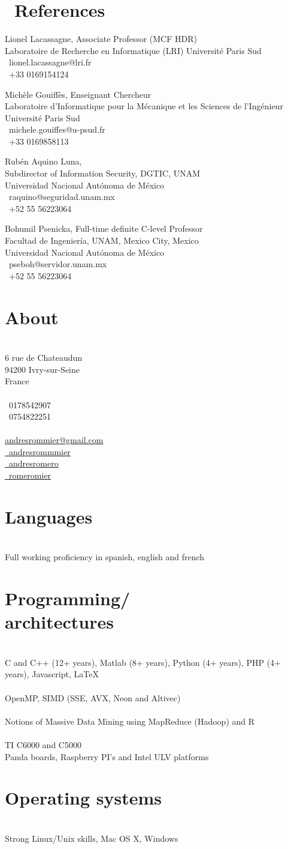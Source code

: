 \documentclass[]{friggeri-cv}
\makeatletter
\def\twitter{{\FA \faTwitter}}
\def\github{{\FA \faGithub}}
\def\linkedin{{\FA \faLinkedin}}
\def\envelope{{\FA \faEnvelopeAlt}}
\def\phone{{\FA \faPhone}}
\def\mobilePhone{{\FA \faMobilePhone}}
\def\quotesymbol{{\FA \faQuote}}
\newcommand{\printaside}{
  \begin{aside}
    \section{About}
      \\
      {6 rue de Chateaudun\\
        94200 Ivry-sur-Seine\\
        France\\
        ~\\
        \phone\ 0178542907\\
        \mobilePhone\ 0754822251\\
        ~\\
        \href{mailto:andresrommier@gmail.com}{\envelope andresrommier@gmail.com}\\
        \href{http://twitter.com/andresrommier}{\twitter\ andresrommmier}\\
        \href{http://andresromero.github.com}{\github\ andresromero}\\
        \href{https://www.linkedin.com/in/romeromier}{\linkedin\ romeromier}}\\
    \section{Languages}\\
      {Full working proficiency in spanish, english and french}\\
    \section{Programming/ \\ architectures}\\
      {C and C++ (12+ years), Matlab (8+ years), Python (4+ years), PHP (4+ years), Javascript, {\stdfont \LaTeX} }\\
      ~\\
      {OpenMP, SIMD (SSE, AVX, Neon and Altivec)}\\
      ~\\
      {Notions of Massive Data Mining using MapReduce (Hadoop) and R}\\
      ~\\
      {TI C6000 and C5000}\\
      {Panda boards, Raspberry PI's and Intel ULV platforms}\\
    \section{Operating systems}\\
      {Strong Linux/Unix skills, Mac OS X, Windows}\\
  \end{aside}
}
\makeatother
\begin{document}
\begin{refsection}
  \nocite{*}
  \printbibliography[sorting=chronological, type=inproceedings, title={International peer-reviewed conferences/proceedings}, notkeyword={france}, heading=subbibliography]
\end{refsection}
\begin{refsection}
  \nocite{*}
  \printbibliography[sorting=chronological, type=inproceedings, title={local peer-reviewed conferences/proceedings}, keyword={france}, heading=subbibliography]
\end{refsection}

\section{{\quotesymbol}\ References}
  Lionel Lacassagne, Associate Professor (MCF HDR) \\
  Laboratoire de Recherche en Informatique (LRI)
  Université Paris Sud\\
  \envelope\ lionel.lacassagne@lri.fr\\
  \phone\ +33 0169154124

  \dottedline

  Michèle Gouiffès, Enseignant Chercheur \\
  Laboratoire d'Informatique pour la Mécanique et les Sciences de l'Ingénieur \\
  Université Paris Sud\\
  \envelope\ michele.gouiffes@u-psud.fr\\
  \phone\ +33 0169858113

  \dottedline

  Rubén Aquino Luna,  \\
  Subdirector of Information Security, DGTIC, UNAM \\
  Universidad Nacional Autónoma de México \\
  \envelope\ raquino@seguridad.unam.mx\\
  \phone\ +52 55 56223064

  \dottedline

  Bohumil Psenicka, Full-time definite C-level Professor \\
  Facultad de Ingeniería, UNAM, Mexico City, Mexico \\
  Universidad Nacional Autónoma de México \\
  \envelope\ pseboh@servidor.unam.mx\\
  \phone\ +52 55 56223064

\printaside
\end{document}
